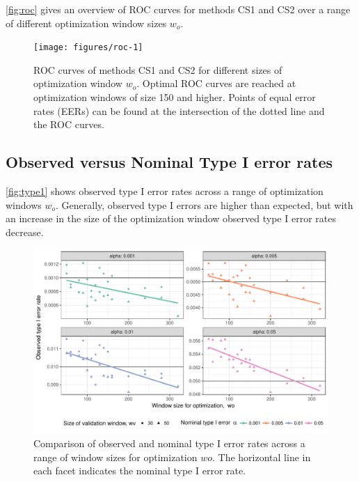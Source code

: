 \documentclass[12pt]{article}
\begin{document}
\autoref{fig:roc} gives an overview of ROC curves for methods CS1 and
CS2 over a range of different optimization window sizes \(w_o\).

\begin{figure}

{\centering \texttt{[image: figures/roc-1]} 

}

\caption{ROC curves of methods CS1 and CS2 for different sizes of optimization window $w_o$. Optimal ROC curves are reached at optimization windows of size 150 and higher. Points of equal error rates (EERs) can be found at the intersection of the dotted line and the ROC curves.}\label{fig:roc}
\end{figure}

\subsection{Observed versus Nominal Type I error
rates}\label{observed-versus-nominal-type-i-error-rates}

\autoref{fig:type1} shows observed type I error rates across a range of
optimization windows \(w_o\). Generally, observed type I errors are
higher than expected, but with an increase in the size of the
optimization window observed type I error rates decrease.

\begin{figure}

{\centering \includegraphics[width=\textwidth]{figures/type1-1} 

}

\caption{Comparison of observed and nominal type I error rates  across a range of window sizes for optimization $wo$. The horizontal line in each facet indicates the nominal type I error rate.}\label{fig:type1}
\end{figure}
\end{document}
